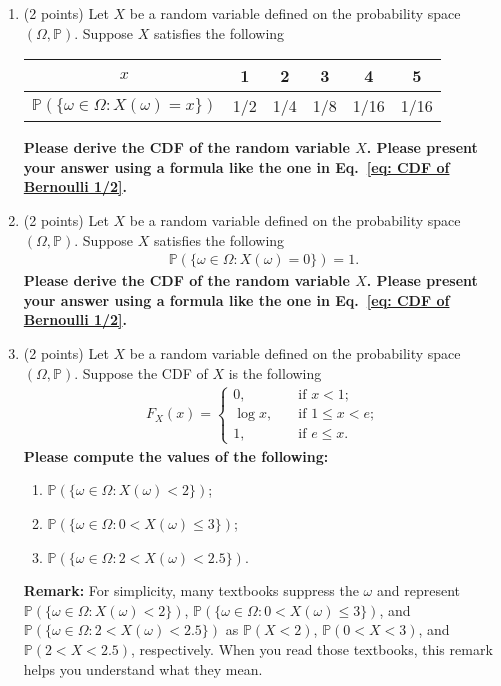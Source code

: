 \documentclass[11pt]{article}
\begin{document}
\begin{enumerate}
\item (2 points) Let $X$ be a random variable defined on the probability space $(\Omega,\mathbb{P})$. Suppose $X$ satisfies the following
\begin{table}[h]
\centering
\begin{tabular}{c|ccccc} \hline
$x$ & 1 & 2 & 3 & 4 & 5 \\\hline
$\mathbb{P}(\{\omega\in\Omega: X(\omega)=x\})$ & 1/2 & 1/4 & 1/8 & 1/16 & 1/16 \\\hline
\end{tabular}
\end{table}

\textbf{Please derive the CDF of the random variable $X$. Please present your answer using a formula like the one in Eq.~\eqref{eq: CDF of Bernoulli 1/2}.}


\item (2 points) Let $X$ be a random variable defined on the probability space $(\Omega,\mathbb{P})$. Suppose $X$ satisfies the following
\begin{align*}
    \mathbb{P}(\{\omega\in\Omega: X(\omega)=0\})=1.
\end{align*}
\textbf{Please derive the CDF of the random variable $X$. Please present your answer using a formula like the one in Eq.~\eqref{eq: CDF of Bernoulli 1/2}.}


\item (2 points) Let $X$ be a random variable defined on the probability space $(\Omega,\mathbb{P})$. Suppose the CDF of $X$ is the following
\begin{align*}
    F_X(x)=\left\{
    \begin{aligned}
    0,\ \ \ &\text{ if }x<1;\\
    \log x,\ \ \ &\text{ if }1\le x<e;\\
    1,\ \ \ &\text{ if }e\le x.
    \end{aligned}
    \right.
\end{align*}
\textbf{Please compute the values of the following:}
\begin{enumerate}
    \item $\mathbb{P}(\{\omega\in\Omega: X(\omega)<2\})$;
    \item $\mathbb{P}(\{\omega\in\Omega: 0<X(\omega)\le3\})$;
    \item $\mathbb{P}(\{\omega\in\Omega: 2<X(\omega)<2.5\})$.
\end{enumerate}
\textbf{Remark:} For simplicity, many textbooks suppress the $\omega$ and represent  $\mathbb{P}(\{\omega\in\Omega: X(\omega)<2\})$, $\mathbb{P}(\{\omega\in\Omega: 0<X(\omega)\le3\})$, and $\mathbb{P}(\{\omega\in\Omega: 2<X(\omega)<2.5\})$ as $\mathbb{P}(X<2)$, $\mathbb{P}(0<X<3)$, and $\mathbb{P}(2<X<2.5)$, respectively. When you read those textbooks, this remark helps you understand what they mean.

\end{enumerate}


\newpage
\end{document}
